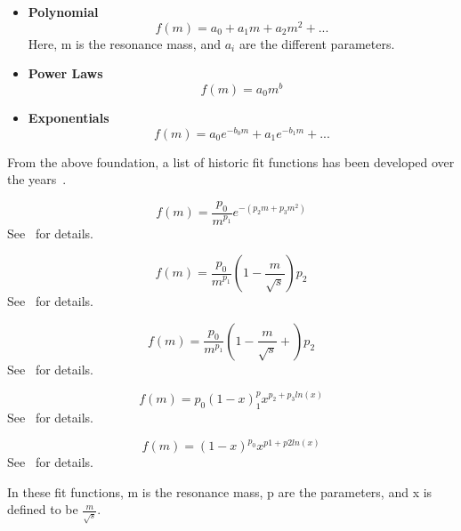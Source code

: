     \begin{itemize}

    \item \textbf{Polynomial}
        \begin{equation}
            f(m)= a_0 + a_{1}m + a_{2}m^{2}+...
        \end{equation} Here, m is the resonance mass, and $a_{i}$ are the different parameters.
    \item \textbf{Power Laws}
        \begin{equation}
            f(m)= a_{0}m^{b}
        \end{equation}

    \item \textbf{Exponentials}
        \begin{equation}
            f(m) = a_{0}e^{-b_{0}m} +a_{1}e^{-b_{1}m}+...
        \end{equation}
    \end{itemize}

From the above foundation, a list of historic fit functions has been developed over the years~\cite{Pachal:2063032}.

    \begin{equation}
        f(m)=\frac{p_{0}}{m^{p_{1}}}e^{-(p_{2}m+p_{3}m^{2})}
    \end{equation}See~\cite{UA2:1990gao} for details.

    \begin{equation}
        f(m)=\frac{p_{0}}{m^{p_{1}}}(1-\frac{m}{\sqrt{s}})p_{2}
    \end{equation}See~\cite{1995} for details.

    \begin{equation}
        f(m)=\frac{p_{0}}{m^{p_{1}}}(1-\frac{m}{\sqrt{s}}+)p_{2}
    \end{equation}See~\cite{b582dc2d9c234174bfe2adbc9729bf42} for details.

    \begin{equation}
        f(m)=p_{0}(1-x)^p_{1}x^{p_{2}+p_{3}ln(x)}
    \end{equation}See~\cite{2009} for details.

    \begin{equation}
        f(m)=(1-x)^{p_{0}}x^{p1+p2ln(x)}
    \end{equation}See~\cite{2014} for details.

    In these fit functions, m is the resonance mass, p are the parameters, and x is defined to be $\frac{m}{\sqrt{s}}$.

